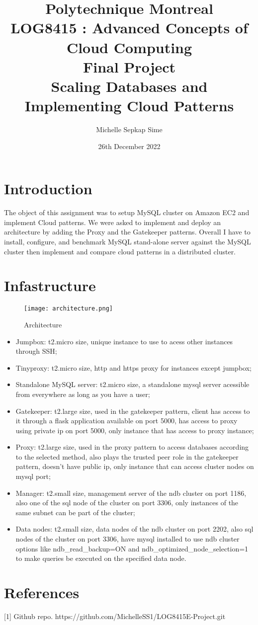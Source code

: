 \documentclass[11pt]{article}
\title{Polytechnique Montreal\\LOG8415 : Advanced Concepts of Cloud Computing\\Final Project\\Scaling Databases and Implementing Cloud Patterns}
\author{
    Michelle Sepkap Sime\\
}
\date{26th December 2022}
\begin{document}
\maketitle

\maketitle

\section{Introduction}
The object of this assignment was to setup MySQL cluster on Amazon EC2 and implement Cloud patterns.
We were asked to implement and deploy an architecture by adding the Proxy and the Gatekeeper patterns. Overall I have to install, configure, and benchmark MySQL stand-alone server against the MySQL cluster then implement and compare cloud patterns in a distributed cluster.

\section{Infastructure}

\begin{figure}
    \texttt{[image: architecture.png]}
    \caption{Architecture}
    \label{fig:arch}
\end{figure}

\vspace*{0.5cm}
\noindent
\begin{itemize}
\item Jumpbox: t2.micro size, unique instance to use to acess other instances through SSH;
\item Tinyproxy: t2.micro size, http and https proxy for instances except jumpbox;
\item Standalone MySQL server: t2.micro size, a standalone mysql server acessible from everywhere as long as you have a user;
\item Gatekeeper: t2.large size, used in the gatekeeper pattern, client has access to it through a flask application available on port 5000, has access to proxy using private ip on port 5000, only instance that has access to proxy instance;
\item Proxy: t2.large size, used in the proxy pattern to access databases according to the selected method, also plays the trusted peer role in the gatekeeper pattern, doesn't have public ip, only instance that can access cluster nodes on mysql port;
\item Manager: t2.small size, management server of the ndb cluster on port 1186, also one of the sql node of the cluster on port 3306, only instances of the same subnet can be part of the cluster;
\item Data nodes: t2.small size, data nodes of the ndb cluster on port 2202, also sql nodes of the cluster on port 3306, have mysql installed to use ndb cluster options like ndb\_read\_backup=ON and ndb\_optimized\_node\_selection=1 to make queries be executed on the specified data node.
\end{itemize}

\section{References}
[1] Github repo. https://github.com/MichelleSS1/LOG8415E-Project.git\newline
\end{document}

